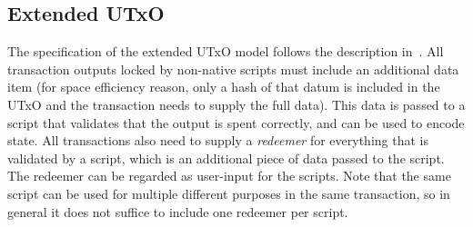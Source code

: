 \subsection{Extended UTxO}

The specification of the extended UTxO model follows the description in~\cite{plutus_eutxo}.
All transaction outputs locked by non-native scripts must include an additional data item (for space efficiency reason, only a hash of that datum is included in the UTxO and the transaction needs to supply the full data). This data is passed to a script that validates that the output is spent correctly, and can be used to encode state.
All transactions also need to supply a \emph{redeemer} for everything that is validated by a script, which is an additional piece of data passed to the script. The redeemer can be regarded as user-input for the scripts. Note that the same script can be used for multiple different purposes in the same transaction, so in general it does not suffice to include one redeemer per script.